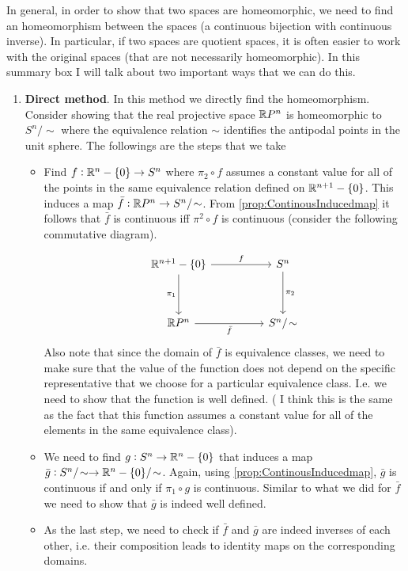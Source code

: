 \begin{summary}
	\label{summary:ShowingHomeoInQuotientSpaces}
	In general, in order to show that two spaces are homeomorphic, we need to find an homeomorphism between the spaces (a continuous bijection with continuous inverse). In particular, if two spaces are quotient spaces, it is often easier to work with the original spaces (that are not necessarily homeomorphic). In this summary box I will talk about two important ways that we can do this. 
	
	\begin{enumerate}
		\item \textbf{Direct method}. In this method we directly find the homeomorphism. Consider showing that the real projective space $ \mathbb{R} P^n $ is homeomorphic to $ S^n/\sim $ where the equivalence relation $ \sim $ identifies the antipodal points in the unit sphere. The followings are the steps that we take
		\begin{itemize}
			\item Find $ f: \mathbb{R}^n-\{0\} \to S^n $ where $ \pi_2 \circ f $ assumes a constant value for all of the points in the same equivalence relation defined on $ \mathbb{R}^{n+1}-\{0\} $. This induces a map $ \bar{f}: \R P^n \to S^n/\sim $. From \autoref{prop:ContinousInducedmap} it follows that $ \bar{f} $ is continuous iff $ \pi^2 \circ f $ is continuous (consider the following commutative diagram).
			
			
			\[\begin{tikzcd}
				{\R^{n+1}-\set{0}} && {S^n} \\
				\\
				{\R P^n} && {S^n/\sim}
				\arrow["f", from=1-1, to=1-3]
				\arrow["{\pi_1}"', from=1-1, to=3-1]
				\arrow["{\pi_2}", from=1-3, to=3-3]
				\arrow["{\bar{f}}"', from=3-1, to=3-3]
			\end{tikzcd}\]
			\noindent Also note that since the domain of $ \bar{f} $ is equivalence classes, we need to make sure that the value of the function does not depend on the specific representative that we choose for a particular equivalence class. I.e. we need to show that the function is well defined. ({\color{orange} I think this is the same as the fact that this function assumes a constant value for all of the elements in the same equivalence class}).
			\item We need to find $ g: S^n \to \mathbb{R}^n-\{0\}  $ that induces a map $ \bar{g}: S^n/\sim \to \R^n-\set{0}/\sim  $. Again, using \autoref{prop:ContinousInducedmap}, $ \bar{g} $ is continuous if and only if $ \pi_1\circ g $ is continuous. Similar to what we did for $ \bar{f} $ we need to show that $ \bar{g} $ is indeed well defined.
			\item As the last step, we need to check if $ \bar{f} $ and $ \bar{g} $ are indeed inverses of each other, i.e. their composition leads to identity maps on the corresponding domains. 
			

\end{itemize}
\end{enumerate}
\end{summary}
